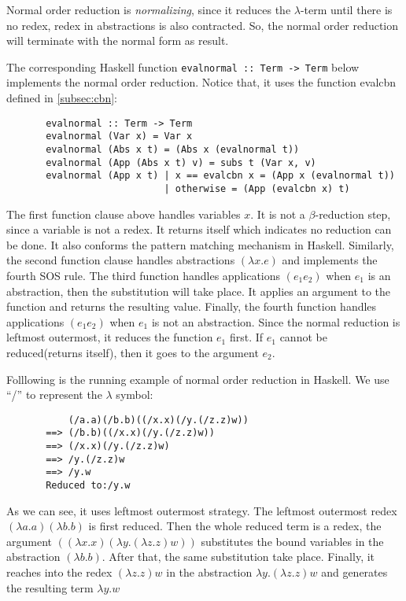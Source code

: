 \documentclass[a4paper,11pt,twoside]{report}
\begin{document}
Normal order reduction is \textit{normalizing}, since it reduces the $\lambda$-term until there is no redex, redex in abstractions is also contracted. So, the normal order reduction will terminate with the normal form as result. 

The corresponding Haskell function \verb|evalnormal :: Term -> Term| below implements the normal order reduction. Notice that, it uses the function evalcbn defined in \ref{subsec:cbn}:

\begin{verbatim}
       evalnormal :: Term -> Term
       evalnormal (Var x) = Var x
       evalnormal (Abs x t) = (Abs x (evalnormal t))
       evalnormal (App (Abs x t) v) = subs t (Var x, v)
       evalnormal (App x t) | x == evalcbn x = (App x (evalnormal t))
                            | otherwise = (App (evalcbn x) t)
\end{verbatim}

The first function clause above handles variables $x$. It is not a $\beta$-reduction step, since a variable is not a redex. It returns itself which indicates no reduction can be done. It also conforms the pattern matching mechanism in Haskell. Similarly, the second function clause handles abstractions $(\lambda x.e)$ and implements the fourth SOS rule. The third function handles applications $(e_1e_2)$ when $e_1$ is an abstraction, then the substitution will take place. It applies an argument to the function and returns the resulting value. Finally, the fourth function handles  applications $(e_1e_2)$ when $e_1$ is not an abstraction. Since the normal reduction is leftmost outermost, it reduces the function $e_1$ first. If $e_1$ cannot be reduced(returns itself), then it goes to the argument $e_2$. 


Folllowing is the running example of normal order reduction in Haskell. We use ``/'' to represent the $\lambda$ symbol:

\begin{verbatim}
           (/a.a)(/b.b)((/x.x)(/y.(/z.z)w))
       ==> (/b.b)((/x.x)(/y.(/z.z)w))
       ==> (/x.x)(/y.(/z.z)w)
       ==> /y.(/z.z)w
       ==> /y.w
       Reduced to:/y.w
\end{verbatim}


As we can see, it uses leftmost outermost strategy. The leftmost outermost redex $(\lambda a.a)(\lambda b.b)$ is first reduced. Then the whole reduced term is a redex, the argument $((\lambda x.x)(\lambda y.(\lambda z.z)w))$ substitutes the bound variables in the abstraction $(\lambda b.b)$. After that, the same substitution take place. Finally, it reaches into the redex $(\lambda z.z)w$ in the abstraction $\lambda y.(\lambda z.z)w$ and generates the resulting term $\lambda y.w$
\end{document}
